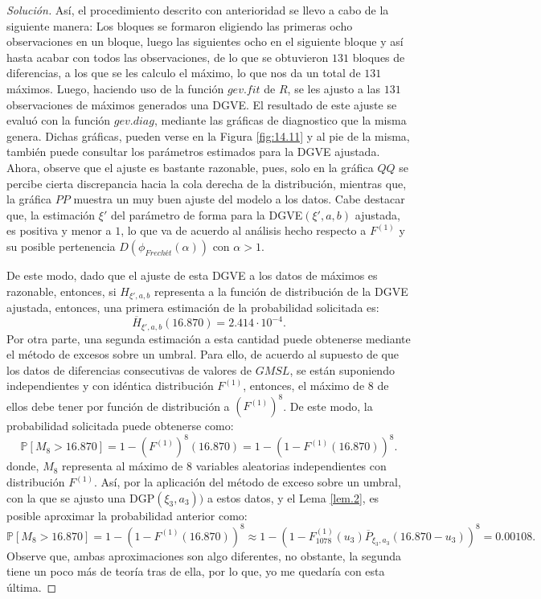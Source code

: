 \documentclass[10.5pt,notitlepage]{article}
\newenvironment{solucion}
  {\begin{proof}[Solución]}
  {\end{proof}}
\newcommand{\PP}{\mathbb{P}}
\theoremstyle{plain}
\begin{document}
\begin{solucion}
Así, el procedimiento descrito con anterioridad se llevo a cabo de la siguiente manera: Los bloques se formaron eligiendo las primeras ocho observaciones en un bloque, luego las siguientes ocho en el siguiente bloque y así hasta acabar con todos las observaciones, de lo que se obtuvieron \(131\) bloques de diferencias, a los que se les calculo el máximo, lo que nos da un total de \(131\) máximos. Luego, haciendo uso de la función \(gev.fit\) de \(R\), se les ajusto a las \(131\) observaciones de máximos generados una DGVE. El resultado de este ajuste se evaluó con la función \(gev.diag\), mediante las gráficas de diagnostico que la misma genera. Dichas gráficas, pueden verse en la Figura \ref{fig:14.11} y al pie de la misma, también puede consultar los parámetros estimados para la DGVE ajustada. Ahora, observe que el ajuste es bastante razonable, pues, solo en la  gráfica \(QQ\) se percibe cierta discrepancia hacia la cola derecha de la distribución, mientras que, la gráfica \(PP\) muestra un muy buen ajuste del modelo a los datos. Cabe destacar que, la estimación \(\xi'\) del parámetro de forma para la DGVE\((\xi',a,b)\) ajustada, es positiva y menor a \(1\), lo que va de acuerdo al análisis hecho respecto a \(F^{(1)}\) y su posible pertenencia \(D(\phi_{Frechét}(\alpha))\) con \(\alpha >1\).

De este modo, dado que el ajuste de esta DGVE a los datos de máximos es razonable, entonces, si \(H_{\xi',a,b}\) representa a la función de distribución de la DGVE ajustada, entonces, una primera estimación de la probabilidad solicitada es:
\[
\overline{H}_{\xi', a, b}(16.870) = 2.414\cdot10^{-4}.
\]
Por otra parte, una segunda estimación a esta cantidad puede obtenerse mediante el método de excesos sobre un umbral. Para ello, de acuerdo al supuesto de que los datos de diferencias consecutivas de valores de \(GMSL\), se están suponiendo independientes y con idéntica distribución \(F^{(1)}\), entonces, el máximo de \(8\) de ellos debe tener por función de distribución a \((F^{(1)})^{8}\). De este modo, la probabilidad solicitada puede obtenerse como: 
\[
\PP[M_{8} > 16.870] =1 - (F^{(1)})^{8}(16.870) = 1 - (1 - F^{(1)} (16.870))^{8}. 
\]
donde, \(M_{8}\) representa al máximo de \(8\) variables aleatorias independientes con distribución \(F^{(1)} \). Así, por la aplicación del método de exceso sobre un umbral, con la que se ajusto una DGP\((\xi_3,a_3))\) a estos datos, y el Lema \ref{lem.2}, es posible aproximar la probabilidad anterior como: 
\[
\PP[M_{8} > 16.870] = 1 - (1 - F^{(1)}(16.870))^{8}\approx1 - (1- F^{(1)}_{1078}(u_3)\overline{P}_{\xi_3,a_{3}}(16.870 - u_3))^{8} = 0.00108. 
\]
Observe que, ambas aproximaciones son algo diferentes, no obstante, la segunda tiene un poco más de teoría tras de ella, por lo que, yo me quedaría con esta última.


\end{solucion}
\end{document}
